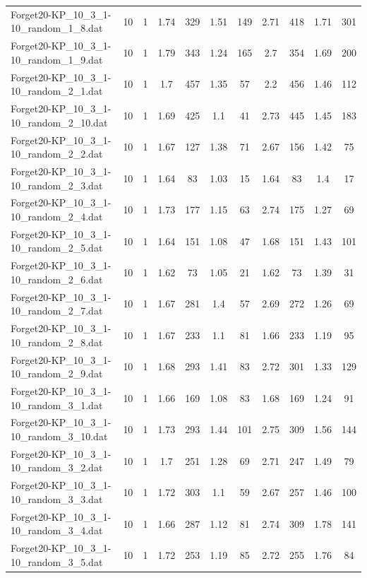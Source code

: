 \begin{table}[!ht]
\begin{tabular}{lcccccccccc}
Forget20-KP\_10\_3\_1-10\_random\_1\_8.dat & 10 & 1 & 1.74 & 329 & 1.51 & 149 & 2.71 & 418 & 1.71 & 301 \\
Forget20-KP\_10\_3\_1-10\_random\_1\_9.dat & 10 & 1 & 1.79 & 343 & 1.24 & 165 & 2.7 & 354 & 1.69 & 200 \\
Forget20-KP\_10\_3\_1-10\_random\_2\_1.dat & 10 & 1 & 1.7 & 457 & 1.35 & 57 & 2.2 & 456 & 1.46 & 112 \\
Forget20-KP\_10\_3\_1-10\_random\_2\_10.dat & 10 & 1 & 1.69 & 425 & 1.1 & 41 & 2.73 & 445 & 1.45 & 183 \\
Forget20-KP\_10\_3\_1-10\_random\_2\_2.dat & 10 & 1 & 1.67 & 127 & 1.38 & 71 & 2.67 & 156 & 1.42 & 75 \\
Forget20-KP\_10\_3\_1-10\_random\_2\_3.dat & 10 & 1 & 1.64 & 83 & 1.03 & 15 & 1.64 & 83 & 1.4 & 17 \\
Forget20-KP\_10\_3\_1-10\_random\_2\_4.dat & 10 & 1 & 1.73 & 177 & 1.15 & 63 & 2.74 & 175 & 1.27 & 69 \\
Forget20-KP\_10\_3\_1-10\_random\_2\_5.dat & 10 & 1 & 1.64 & 151 & 1.08 & 47 & 1.68 & 151 & 1.43 & 101 \\
Forget20-KP\_10\_3\_1-10\_random\_2\_6.dat & 10 & 1 & 1.62 & 73 & 1.05 & 21 & 1.62 & 73 & 1.39 & 31 \\
Forget20-KP\_10\_3\_1-10\_random\_2\_7.dat & 10 & 1 & 1.67 & 281 & 1.4 & 57 & 2.69 & 272 & 1.26 & 69 \\
Forget20-KP\_10\_3\_1-10\_random\_2\_8.dat & 10 & 1 & 1.67 & 233 & 1.1 & 81 & 1.66 & 233 & 1.19 & 95 \\
Forget20-KP\_10\_3\_1-10\_random\_2\_9.dat & 10 & 1 & 1.68 & 293 & 1.41 & 83 & 2.72 & 301 & 1.33 & 129 \\
Forget20-KP\_10\_3\_1-10\_random\_3\_1.dat & 10 & 1 & 1.66 & 169 & 1.08 & 83 & 1.68 & 169 & 1.24 & 91 \\
Forget20-KP\_10\_3\_1-10\_random\_3\_10.dat & 10 & 1 & 1.73 & 293 & 1.44 & 101 & 2.75 & 309 & 1.56 & 144 \\
Forget20-KP\_10\_3\_1-10\_random\_3\_2.dat & 10 & 1 & 1.7 & 251 & 1.28 & 69 & 2.71 & 247 & 1.49 & 79 \\
Forget20-KP\_10\_3\_1-10\_random\_3\_3.dat & 10 & 1 & 1.72 & 303 & 1.1 & 59 & 2.67 & 257 & 1.46 & 100 \\
Forget20-KP\_10\_3\_1-10\_random\_3\_4.dat & 10 & 1 & 1.66 & 287 & 1.12 & 81 & 2.74 & 309 & 1.78 & 141 \\
Forget20-KP\_10\_3\_1-10\_random\_3\_5.dat & 10 & 1 & 1.72 & 253 & 1.19 & 85 & 2.72 & 255 & 1.76 & 84 \\

\end{tabular}
\end{table}
